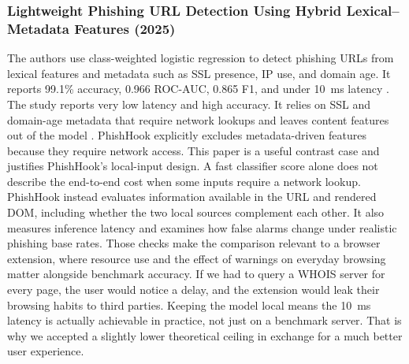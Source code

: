 \documentclass{FastFyp}
\begin{document}
\subsubsection{Lightweight Phishing URL Detection Using Hybrid Lexical--Metadata Features (2025)}
The authors use class-weighted logistic regression to detect phishing URLs from lexical features and metadata such as SSL presence, IP use, and domain age. It reports 99.1\% accuracy, 0.966 ROC-AUC, 0.865 F1, and under 10~ms latency \cite{lexmeta2025}. The study reports very low latency and high accuracy. It relies on SSL and domain-age metadata that require network lookups and leaves content features out of the model \cite{lexmeta2025}. PhishHook explicitly excludes metadata-driven features because they require network access. This paper is a useful contrast case and justifies PhishHook's local-input design. A fast classifier score alone does not describe the end-to-end cost when some inputs require a network lookup. PhishHook instead evaluates information available in the URL and rendered DOM, including whether the two local sources complement each other. It also measures inference latency and examines how false alarms change under realistic phishing base rates. Those checks make the comparison relevant to a browser extension, where resource use and the effect of warnings on everyday browsing matter alongside benchmark accuracy. If we had to query a WHOIS server for every page, the user would notice a delay, and the extension would leak their browsing habits to third parties. Keeping the model local means the 10~ms latency is actually achievable in practice, not just on a benchmark server. That is why we accepted a slightly lower theoretical ceiling in exchange for a much better user experience.
\end{document}
